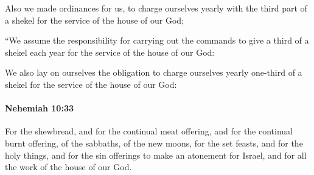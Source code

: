 			\begin{versebox}
					\item[BHS] 
					\item[LXX] 
					\item[ASV] Also we made ordinances for us, to charge ourselves yearly with the third part of a shekel for the service of the house of our God;
					\item[NIV] “We assume the responsibility for carrying out the commands to give a third of a shekel each year for the service of the house of our God:
					\item[NRSV] We also lay on ourselves the obligation to charge ourselves yearly one-third of a shekel for the service of the house of our God:
			\end{versebox}

		\paragraph{Nehemiah 10:33} %
			\label{NEHEMIAH-10-33}

			For the shewbread, and for the continual meat offering, and for the continual burnt offering, of the sabbaths, of the new moons, for the set feasts, and for the holy things, and for the sin offerings to make an atonement for Israel, and for all the work of the house of our God.


